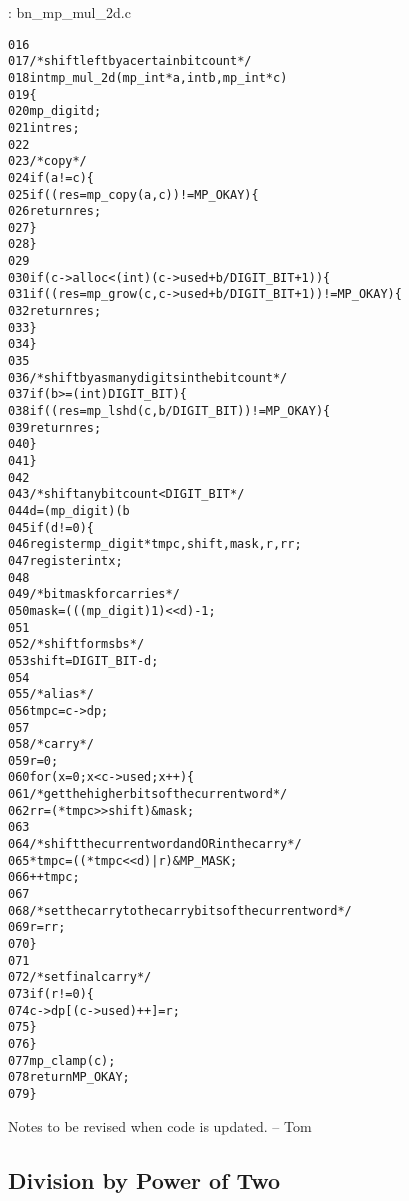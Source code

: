 \documentclass[b5paper]{book}
\begin{document}
\vspace{+3mm}\begin{small}
\hspace{-5.1mm}{\bf File}: bn\_mp\_mul\_2d.c
\vspace{-3mm}
\begin{alltt}
016   
017   /* shift left by a certain bit count */
018   int mp_mul_2d (mp_int * a, int b, mp_int * c)
019   \{
020     mp_digit d;
021     int      res;
022   
023     /* copy */
024     if (a != c) \{
025        if ((res = mp_copy (a, c)) != MP_OKAY) \{
026          return res;
027        \}
028     \}
029   
030     if (c->alloc < (int)(c->used + b/DIGIT_BIT + 1)) \{
031        if ((res = mp_grow (c, c->used + b / DIGIT_BIT + 1)) != MP_OKAY) \{
032          return res;
033        \}
034     \}
035   
036     /* shift by as many digits in the bit count */
037     if (b >= (int)DIGIT_BIT) \{
038       if ((res = mp_lshd (c, b / DIGIT_BIT)) != MP_OKAY) \{
039         return res;
040       \}
041     \}
042   
043     /* shift any bit count < DIGIT_BIT */
044     d = (mp_digit) (b % DIGIT_BIT);
045     if (d != 0) \{
046       register mp_digit *tmpc, shift, mask, r, rr;
047       register int x;
048   
049       /* bitmask for carries */
050       mask = (((mp_digit)1) << d) - 1;
051   
052       /* shift for msbs */
053       shift = DIGIT_BIT - d;
054   
055       /* alias */
056       tmpc = c->dp;
057   
058       /* carry */
059       r    = 0;
060       for (x = 0; x < c->used; x++) \{
061         /* get the higher bits of the current word */
062         rr = (*tmpc >> shift) & mask;
063   
064         /* shift the current word and OR in the carry */
065         *tmpc = ((*tmpc << d) | r) & MP_MASK;
066         ++tmpc;
067   
068         /* set the carry to the carry bits of the current word */
069         r = rr;
070       \}
071       
072       /* set final carry */
073       if (r != 0) \{
074          c->dp[(c->used)++] = r;
075       \}
076     \}
077     mp_clamp (c);
078     return MP_OKAY;
079   \}
\end{alltt}
\end{small}

Notes to be revised when code is updated. -- Tom

\subsection{Division by Power of Two}
\end{document}
